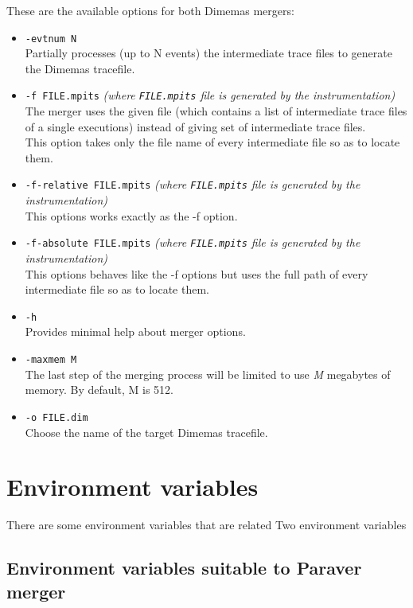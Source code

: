 These are the available options for both Dimemas mergers:

\begin{itemize}
 \item {\tt -evtnum N}\\
 Partially processes (up to N events) the intermediate trace files to generate the Dimemas tracefile.
 \item {\tt -f FILE.mpits} {\em (where {\tt FILE.mpits} file is generated by the instrumentation)}\\
 The merger uses the given file (which contains a list of intermediate trace files of a single executions) instead of giving set of intermediate trace files.\\
 This option takes only the file name of every intermediate file so as to locate them.
 \item {\tt -f-relative FILE.mpits} {\em (where {\tt FILE.mpits} file is generated by the instrumentation)}\\
 This options works exactly as the -f option.
 \item {\tt -f-absolute FILE.mpits} {\em (where {\tt FILE.mpits} file is generated by the instrumentation)}\\
 This options behaves like the -f options but uses the full path of every intermediate file so as to locate them.
 \item {\tt -h}\\
 Provides minimal help about merger options.
 \item {\tt -maxmem M}\\
 The last step of the merging process will be limited to use {\em M} megabytes of memory. By default, M is 512.
 \item {\tt -o FILE.dim}\\
 Choose the name of the target Dimemas tracefile.
\end{itemize}

\section{Environment variables}

There are some environment variables that are related Two environment variables 

\subsection{Environment variables suitable to Paraver merger}

